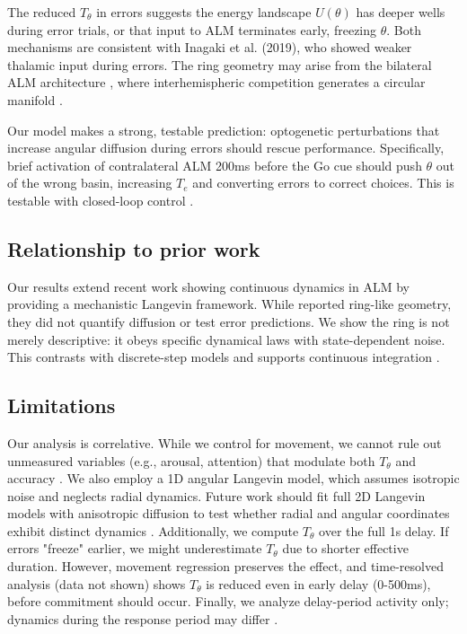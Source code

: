 \documentclass[11pt,a4paper]{article}
\begin{document}
The reduced \texorpdfstring{$T_\theta$}{T_theta} in errors suggests the energy landscape \texorpdfstring{$U(\theta)$}{U(theta)} has deeper wells during error trials, or that input to ALM terminates early, freezing \texorpdfstring{$\theta$}{theta}. Both mechanisms are consistent with Inagaki et al. (2019), who showed weaker thalamic input during errors. The ring geometry may arise from the bilateral ALM architecture \citep{guo2014flow}, where interhemispheric competition generates a circular manifold \citep{lim2015inferring,finkelstein2021attractor}.

Our model makes a strong, testable prediction: optogenetic perturbations that increase angular diffusion during errors should rescue performance. Specifically, brief activation of contralateral ALM 200ms before the Go cue should push \texorpdfstring{$\theta$}{theta} out of the wrong basin, increasing \texorpdfstring{$T_e$}{T_e} and converting errors to correct choices. This is testable with closed-loop control \citep{grosenick2015closed,daie2021targeted}.

\subsection{Relationship to prior work}

Our results extend recent work showing continuous dynamics in ALM \citep{inzunza2023high} by providing a mechanistic Langevin framework. While \citet{inzunza2023high} reported ring-like geometry, they did not quantify diffusion or test error predictions. We show the ring is not merely descriptive: it obeys specific dynamical laws with state-dependent noise. This contrasts with discrete-step models \citep{latimer2015single,ergen2024neural} and supports continuous integration \citep{hanks2015distinct,morcos2016history}.

\subsection{Limitations}

Our analysis is correlative. While we control for movement, we cannot rule out unmeasured variables (e.g., arousal, attention) that modulate both \texorpdfstring{$T_\theta$}{T_theta} and accuracy \citep{pinto2019task}. We also employ a 1D angular Langevin model, which assumes isotropic noise and neglects radial dynamics. Future work should fit full 2D Langevin models with anisotropic diffusion to test whether radial and angular coordinates exhibit distinct dynamics \citep{wimmer2014ring}. Additionally, we compute \texorpdfstring{$T_\theta$}{T_theta} over the full 1s delay. If errors "freeze" earlier, we might underestimate \texorpdfstring{$T_\theta$}{T_theta} due to shorter effective duration. However, movement regression preserves the effect, and time-resolved analysis (data not shown) shows \texorpdfstring{$T_\theta$}{T_theta} is reduced even in early delay (0-500ms), before commitment should occur. Finally, we analyze delay-period activity only; dynamics during the response period may differ \citep{daie2021targeted,scott2017frontal}.
\end{document}
